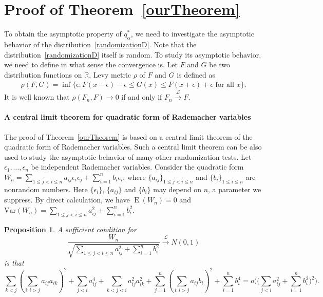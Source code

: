 \documentclass[3p]{elsarticle}
\DeclareMathOperator{\myE}{E}
\theoremstyle{plain}
\newtheorem{proposition}{\quad\quad Proposition}
\theoremstyle{definition}
\theoremstyle{remark}
\begin{document}
\section{Proof of Theorem~\ref{ourTheorem}}



To obtain the asymptotic property of $q^*_{\alpha}$, we need to investigate the asymptotic behavior of the distribution~\eqref{randomizationD}.
Note that the distribution~\eqref{randomizationD} itself is random.  To study its asymptotic behavior, we need to define in what sense the convergence is. Let $F$ and $G$ be two distribution functions on $\mathbb{R}$, Levy metric $\rho$ of $F$ and $G$ is defined as
    \begin{equation*}
    \begin{aligned}
        \rho(F,G)
        =\inf\{\epsilon:F(x-\epsilon)-\epsilon\leq G(x)\leq F(x+\epsilon)+\epsilon  \textrm{ for all } x\}.
    \end{aligned}
    \end{equation*}
It is well known that $\rho(F_n,F)\to 0$ if and only if  $F_n\xrightarrow{\mathcal{L}}F$.

\paragraph{A central limit theorem for quadratic form of Rademacher variables}
The proof of Theorem~\ref{ourTheorem} is based on a central limit theorem of the quadratic form of Rademacher variables. 
Such a central limit theorem can be also used to study the asymptotic behavior of many other randomization tests.
 Let $\epsilon_1,\ldots,\epsilon_n$ be independent Rademacher  variables. 
 Consider the quadratic form $W_n=\sum_{1\leq j<i\leq n} a_{ij}\epsilon_i \epsilon_j+\sum_{i=1}^n b_i \epsilon_i$, where $\{a_{ij}\}_{1\leq j <i \leq n}$ and $\{b_i\}_{1\leq i\leq n}$ are nonrandom numbers.
 Here $\{\epsilon_i\}$, $\{a_{ij}\}$ and $\{b_{i}\}$ may depend on $n$, a parameter we suppress.
 By direct calculation, we have $\myE(W_n)=0$ and $\mathrm{Var}(W_n)=\sum_{1\leq j<i\leq n} a_{ij}^2+\sum_{i=1}^n b_i^2$.

 \begin{proposition}\label{CLTprop}
     A sufficient condition for
     \begin{equation*}
         \frac{W_n}{\sqrt{\sum_{1\leq j<i\leq n} a_{ij}^2 +\sum_{i=1}^n b_i^2}}
         \xrightarrow{\mathcal{L}} N(0,1)
     \end{equation*}
     is that
     \begin{equation}\label{complC}
         \sum_{k<j}(\sum_{i:i>j}a_{ij}a_{ik})^2+
         \sum_{j<i}a_{ij}^4+
         \sum_{k<j<i}a_{ij}^2 a_{ik}^2
         +
     \sum_{j=1}^n (\sum_{i:i>j} a_{ij}b_i)^2 
         +
         \sum_{i=1}^n b_i^4
         =o\Big(\big(\sum_{j<i} a_{ij}^2+\sum_{i=1}^n b_i^2\big)^2\Big).
     \end{equation}
 \end{proposition}
\end{document}
